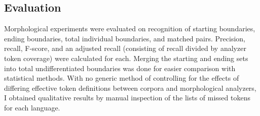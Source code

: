 \subsection{Evaluation}
Morphological experiments were evaluated on recognition of starting boundaries, ending boundaries, total individual boundaries, and matched pairs. Precision, recall, F-score, and an adjusted recall (consisting of recall divided by analyzer token coverage) were calculated for each. Merging the starting and ending sets into total undifferentiated boundaries was done for easier comparison with statistical methods.
With no generic method of controlling for the effects of differing effective token definitions between corpora and morphological analyzers, I obtained qualitative results by manual inspection of the lists of missed tokens for each language.


